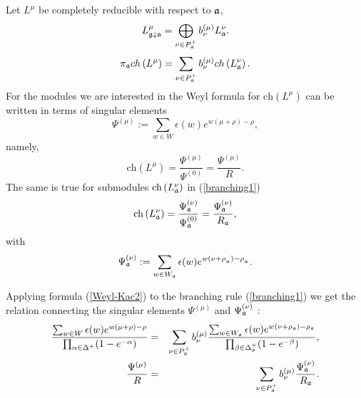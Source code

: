 \documentclass[12pt]{article}
\begin{document}
Let $L^{\mu }$ be completely reducible with respect to $\frak{a}$,
\begin{equation*}
L_{\frak{g}\downarrow \frak{a}}^{\mu }=\bigoplus\limits_{\nu \in P_{\frak{a}%
}^{+}}b_{\nu }^{\left( \mu \right) }L_{\frak{a}}^{\nu }.
\end{equation*}
\begin{equation}
\pi _{\frak{a}}ch\left( L^{\mu }\right) =\sum_{\nu \in P_{\frak{a}%
}^{+}}b_{\nu }^{(\mu )}ch\left( L_{\frak{a}}^{\nu }\right) .
\label{branching1}
\end{equation}
For the modules we are interested in the Weyl formula for $\mathrm{ch}%
\left( L^{\mu }\right) $ can be written in terms of singular
elements \cite {humphreys1997introduction}
\begin{equation*}
\Psi ^{\left( \mu \right) }:=\sum\limits_{w\in W}\epsilon
(w)e^{w(\mu +\rho )-\rho },
\end{equation*}
namely,
\begin{equation}
\mathrm{ch}\left( L^{\mu }\right) =\frac{\Psi ^{\left( \mu \right)
}}{\Psi ^{\left( 0\right) }}=\frac{\Psi ^{\left( \mu \right)
}}{R}. \label{Weyl-Kac2}
\end{equation}
The same is true for submodules $\mathrm{ch}\left(
L_{\frak{a}}^{\nu }\right) $ in (\ref{branching1})
\begin{equation*}
\mathrm{ch}\left( L_{\frak{a}}^{\nu }\right) =\frac{\Psi
_{\frak{a}}^{\left(
\nu \right) }}{\Psi _{\frak{a}}^{\left( 0\right) }}=\frac{\Psi _{\frak{a}%
}^{\left( \nu \right) }}{R_{\frak{a}}},
\end{equation*}
with
\begin{equation*}
\Psi _{\frak{a}}^{\left( \nu \right) }:=\sum\limits_{w\in W_{\frak{a}%
}}\epsilon (w)e^{w(\nu +\rho _{_{\frak{a}}})-\rho _{_{\frak{a}}}}.
\end{equation*}

Applying formula (\ref{Weyl-Kac2}) to the branching rule
(\ref{branching1}) we get the relation connecting the singular
elements $\Psi ^{\left( \mu \right) }$ and $\Psi
_{\frak{a}}^{\left( \nu \right) }$ :
\begin{eqnarray}
 \frac{\sum_{w \in W}\epsilon (w )e^{w (\mu
+\rho )-\rho }}{\prod_{\alpha \in \Delta ^{+}}(1-e^{-\alpha })}
&=&\sum_{\nu \in P_{\frak{a}}^{+}}b_{\nu }^{(\mu )}\frac{%
\sum_{w \in W_{\frak{a}}}\epsilon (w )e^{w (\nu +\rho _{\frak{a}})-\rho _{%
\frak{a}}}}{\prod_{\beta \in \Delta _{\frak{a}}^{+}}(1-e^{-\beta })},
\notag  \label{eq:4} \\
\frac{\Psi ^{\left( \mu \right) }}{R}
&=&\sum_{\nu \in P_{\frak{a}}^{+}}b_{\nu }^{(\mu )}\frac{\Psi _{\frak{a}%
}^{\left( \nu \right) }}{R_{\frak{a}}}.
\label{singular main}
\end{eqnarray}
\end{document}
